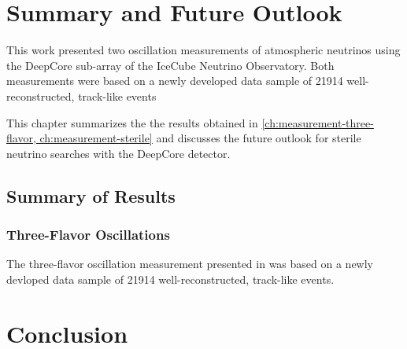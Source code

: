 \setchapterpreamble[u]{\margintoc}
\chapter{Summary and Future Outlook}

This work presented two oscillation measurements of atmospheric neutrinos using the DeepCore sub-array of the IceCube Neutrino Observatory. Both measurements were based on a newly developed data sample of \num{21914} well-reconstructed, track-like events

This chapter summarizes the the results obtained in \cref{ch:measurement-three-flavor, ch:measurement-sterile} and discusses the future outlook for sterile neutrino searches with the DeepCore detector.

\section{Summary of Results}
\label{sec:summary}

\subsection{Three-Flavor Oscillations}
\label{sec:summary-three-flavor}

The three-flavor oscillation measurement presented in  was based on a newly devloped data sample of \num{21914} well-reconstructed, track-like events.

\chapter{Conclusion}
